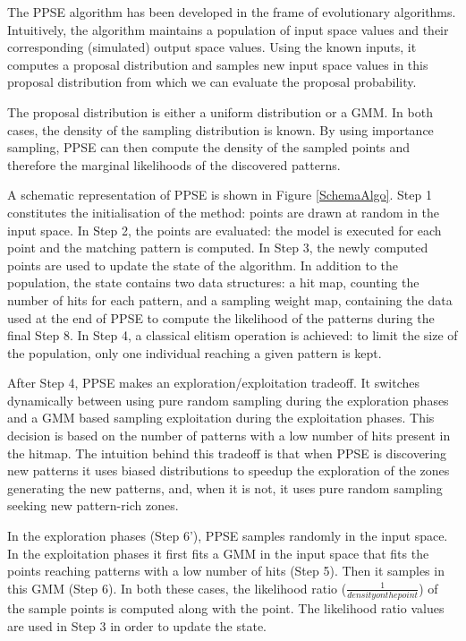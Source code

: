 \documentclass[10pt,letterpaper]{article}
\theoremstyle{definition}
\theoremstyle{remark}
\begin{document}
The PPSE algorithm has been developed in the frame of evolutionary algorithms. Intuitively, the algorithm maintains a population of input space values and their corresponding (simulated) output space values. 
Using the known inputs, it computes a proposal distribution and samples new input space values in this proposal distribution from which we can evaluate the proposal probability. 

The proposal distribution is either a uniform distribution or a GMM. 
In both cases, the density of the sampling distribution is known. 
By using importance sampling, PPSE can then compute the density of the sampled points and therefore the marginal likelihoods of the discovered patterns.

A schematic representation of PPSE is shown in Figure \ref{SchemaAlgo}. 
Step 1 constitutes the initialisation of the method: points are drawn at random in the input space. 
In Step 2, the points are evaluated: the model is executed for each point and the matching pattern is computed.
In Step 3, the newly computed points are used to update the state of the algorithm. 
In addition to the population, the state contains two data structures: a hit map, counting the number of hits for each pattern, and a sampling weight map, containing the data used at the end of PPSE to compute the likelihood of the patterns during the final Step 8. 
In Step 4, a classical elitism operation is achieved: to limit the size of the population, only one individual reaching a given pattern is kept. 

After Step 4, PPSE makes an exploration/exploitation tradeoff. 
It switches dynamically between using pure random sampling during the exploration phases and a GMM based sampling exploitation during the exploitation phases. 
This decision is based on the number of patterns with a low number of hits present in the hitmap. 
The intuition behind this tradeoff is that when PPSE is discovering new patterns it uses biased distributions to speedup the exploration of the zones generating the new patterns, and, when it is not, it uses pure random sampling seeking new pattern-rich zones.  

In the exploration phases (Step 6'), PPSE samples randomly in the input space. 
In the exploitation phases it first fits a GMM in the input space that fits the points reaching patterns with a low number of hits (Step 5). 
Then it samples in this GMM (Step 6). 
In both these cases, the likelihood ratio ($\frac{1}{density on the point}$) of the sample points is computed along with the point. 
The likelihood ratio values are used in Step 3 in order to update the state. 
\end{document}
